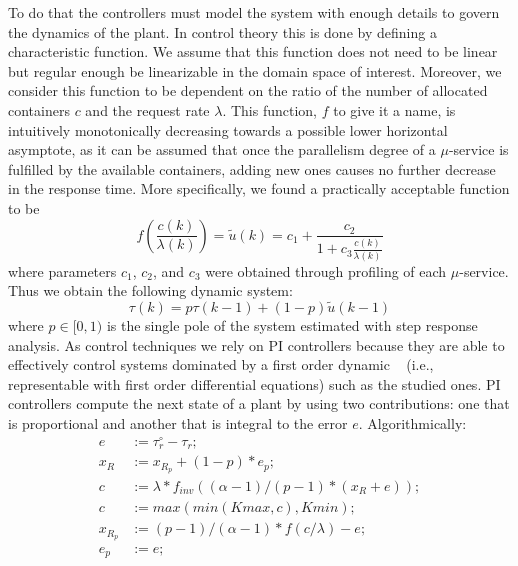 To do that the controllers must model the system with enough details to govern the dynamics of the plant. In control theory this is done by defining a characteristic function. We assume that this function does not need to be linear but regular enough be linearizable in the domain space of interest. Moreover, we consider this function to be dependent on the ratio of the number of allocated containers $c$ and the request rate $\lambda$.  This function, $f$ to give it a name, is intuitively monotonically decreasing towards a possible lower horizontal asymptote, as it can be assumed that once the parallelism degree of a $\mu$-service is fulfilled by the available containers, adding new ones causes no further decrease in the response time. More specifically, we found a practically acceptable function to be
\begin{equation}
f \left( \frac{c(k)}{\lambda(k)}\right)  = \widetilde{u}(k) = c_1+\frac{c_2}{1+c_3\frac{c(k)}{\lambda(k)}}
\label{eqn:CsysModel-f}
\end{equation}
\noindent where parameters $c_1$, $c_2$, and $c_3$ were obtained through profiling of each $\mu$-service. Thus we obtain the following dynamic system:
\begin{equation}
\tau(k)  = p \tau(k-1) + (1-p)\widetilde{u}(k-1)
\label{eqn:CsysModel-s}
\end{equation}
where $p \in [0,1)$ is the single pole of the system estimated with step response analysis. As control techniques we rely on PI controllers because they are able to effectively control systems dominated by a first order dynamic ~\cite{aastrom1995pid} (i.e., representable with first order differential equations) such as the studied ones. PI controllers compute the next state of a plant by using two contributions: one that is proportional and another that is integral to the error $e$. Algorithmically: 
\begin{align*}
e   &:= \tau_r^{\circ}-\tau_r;\\
x_R &:= x_{R_p}+(1-p)*e_p;\\
c   &:= \lambda*f_{inv}((\alpha-1)/(p-1)*(x_R+e));\\
c   &:= max(min(Kmax,c), Kmin);\\
x_{R_p} &:= (p-1)/(\alpha-1)*f(c/\lambda)-e;\\
e_p  &:= e;
\end{align*}
